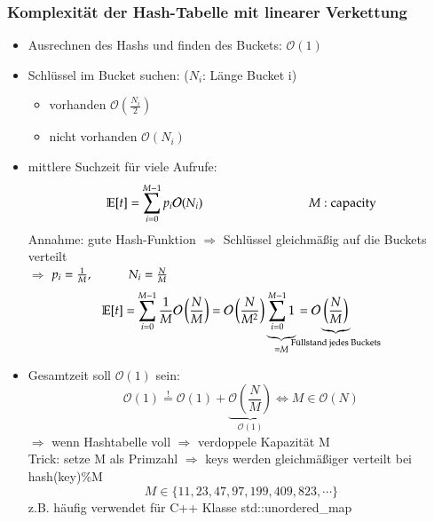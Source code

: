 \documentclass[11pt, fleqn]{scrreprt}
\begin{document}
\subsubsection*{Komplexität der Hash-Tabelle mit linearer Verkettung}
\begin{itemize}
	\item Ausrechnen des Hashs und finden des Buckets: $\mathcal{O}(1)$
	\item Schlüssel im Bucket suchen: ($N_i$: Länge Bucket i)
	\begin{itemize}
		\item vorhanden $\mathcal{O}\left(\frac{N_i}{2}\right)$
		\item nicht vorhanden $\mathcal{O}(N_i)$
	\end{itemize}
	\item mittlere Suchzeit für viele Aufrufe:
	\[ \mathbb{E}[t] = \sum_{i=0}^{M-1} p_i\mathcal{O}(N_i) \hspace*{3cm} M : \text{capacity} \]
	Annahme: gute Hash-Funktion $\Rightarrow$ Schlüssel gleichmäßig auf die Buckets verteilt\\ $\Rightarrow$ $p_i = \frac{1}{M}, \hspace*{1cm} N_i = \frac{N}{M}$
	\[ \mathbb{E}[t] = \sum_{i=0}^{M-1} \frac{1}{M} \mathcal{O} \left(\frac{N}{M}\right) = \mathcal{O} \left(\frac{N}{M^2}\right) \underbrace{\sum_{i=0}^{M-1} 1}_{=M} = \mathcal{O} \hspace*{-9mm} \underbrace{\left(\frac{N}{M}\right)}_{\text{Füllstand jedes Buckets}}\]
	\item Gesamtzeit soll $\mathcal{O}(1)$ sein:
	\[ \mathcal{O}(1)  \stackrel{!}{=} \mathcal{O}(1) + \underbrace{\mathcal{O}\left(\frac{N}{M}\right)}_{\mathcal{O}(1)} \Leftrightarrow M \in \mathcal{O}(N)\]
$\Rightarrow$ wenn Hashtabelle voll $\Rightarrow$ verdoppele Kapazität M \\
Trick: setze M als Primzahl $\Rightarrow$ keys werden gleichmäßiger verteilt bei hash(key)\%M
\[ M \in \{11, 23, 47, 97, 199, 409, 823, \cdots\}\]
z.B. häufig verwendet für C++ Klasse std::unordered\_map
\end{itemize}
\end{document}
